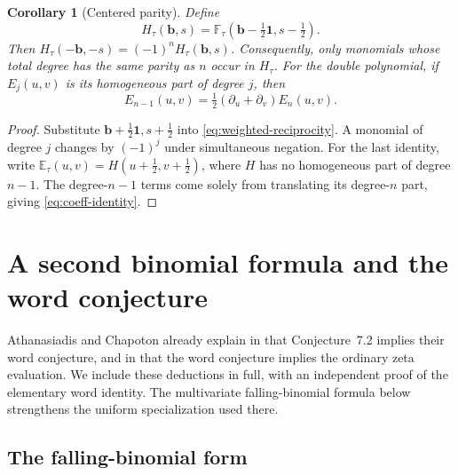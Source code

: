 \documentclass[11pt,letterpaper]{article}
\newtheorem{corollary}[corollary]{Corollary}
\theoremstyle{definition}
\newcommand{\one}{\mathbf 1}
\newcommand{\bvec}{\mathbf b}
\newcommand{\EE}{\mathbb E}
\newcommand{\FF}{\mathbb F}
\begin{document}
\begin{corollary}[Centered parity]\label{cor:parity}
Define
\[
 H_\tau(\bvec,s)=\FF_\tau(\bvec-\tfrac12\one,s-\tfrac12).
\]
Then $H_\tau(-\bvec,-s)=(-1)^n H_\tau(\bvec,s)$. Consequently, only
monomials whose total degree has the same parity as $n$ occur in $H_\tau$.
For the double polynomial, if $E_j(u,v)$ is its homogeneous part of degree
$j$, then
\begin{equation}\label{eq:coeff-identity}
 E_{n-1}(u,v)=\tfrac12(\partial_u+\partial_v)E_n(u,v).
\end{equation}
\end{corollary}
\begin{proof}
Substitute $\bvec+\tfrac12\one,s+\tfrac12$ into
\eqref{eq:weighted-reciprocity}. A monomial of degree $j$ changes by
$(-1)^j$ under simultaneous negation. For the last identity, write
$\EE_\tau(u,v)=H(u+\tfrac12,v+\tfrac12)$, where $H$ has no homogeneous
part of degree $n-1$. The degree-$n-1$ terms come solely from translating
its degree-$n$ part, giving \eqref{eq:coeff-identity}.
\end{proof}

\section{A second binomial formula and the word conjecture}\label{sec:words}

Athanasiadis and Chapoton already explain in \cite[Remark~7.3]{AC26}
that Conjecture~7.2 implies their word conjecture, and in
\cite[Remark~4.10(a)]{AC26} that the word conjecture implies the ordinary
zeta evaluation. We include these deductions in full, with an independent
proof of the elementary word identity. The multivariate falling-binomial
formula below strengthens the uniform specialization used there.

\subsection{The falling-binomial form}
\end{document}
